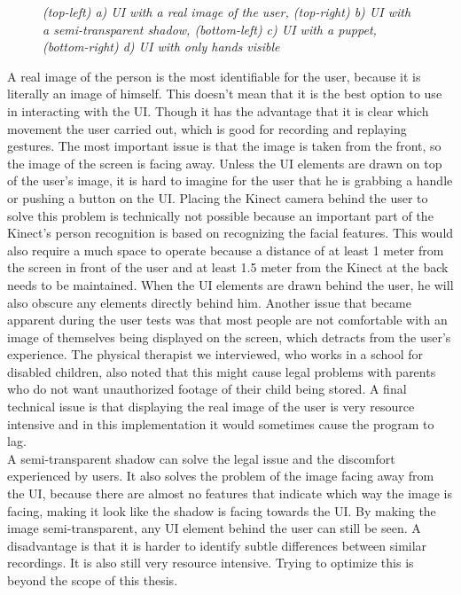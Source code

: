 \begin{figure}[H]
\begin{center}
 		\caption{\emph{(top-left) a) UI with a real image of the user, (top-right) b) UI with a semi-transparent shadow, (bottom-left) c) UI with a puppet, (bottom-right) d) UI with only hands visible}}
 		\label{user visualizations}
 	\end{center}
 \end{figure}
 
 
A real image of the person is the most identifiable for the user, because it is literally an image of himself. This doesn't mean that it is the best option to use in interacting with the UI. Though it has the advantage that it is clear which movement the user carried out, which is good for recording and replaying gestures. The most important issue is that the image is taken from the front, so the image of the screen is facing away. Unless the UI elements are drawn on top of the user's image, it is hard to imagine for the user that he is grabbing a handle or pushing a button on the UI. Placing the Kinect camera behind the user to solve this problem is technically not possible because an important part of the Kinect's person recognition is based on recognizing the facial features. This would also require a much space to operate because a distance of at least 1 meter from the screen in front of the user and at least 1.5 meter from the Kinect at the back needs to be maintained. When the UI elements are drawn behind the user, he will also obscure any elements directly behind him. Another issue that became apparent during the user tests was that most people are not comfortable with an image of themselves being displayed on the screen, which detracts from the user's experience. The physical therapist we interviewed, who works in a school for disabled children, also noted that this might cause legal problems with parents who do not want unauthorized footage of their child being stored. A final technical issue is that displaying the real image of the user is very resource intensive and in this implementation it would sometimes cause the program to lag.\\
 
A semi-transparent shadow can solve the legal issue and the discomfort experienced by users. It also solves the problem of the image facing away from the UI, because there are almost no features that indicate which way the image is facing, making it look like the shadow is facing towards the UI. By making the image semi-transparent, any UI element behind the user can still be seen. A disadvantage is that it is harder to identify subtle differences between similar recordings. It is also still very resource intensive. Trying to optimize this is beyond the scope of this thesis.\\
 
